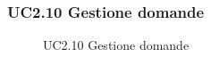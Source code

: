 \subsubsection{UC2.10 Gestione domande}
\begin{figure}[H]
\centering
\noindent{}
\caption{UC2.10 Gestione domande}
\end{figure}
